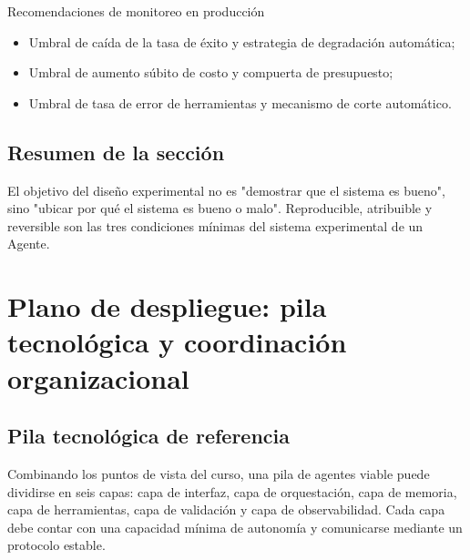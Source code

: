 \documentclass[a4paper]{article}
\begin{document}
\begin{knowledgebox}{Recomendaciones de monitoreo en producción}
\begin{itemize}
    \item Umbral de caída de la tasa de éxito y estrategia de degradación automática;
    \item Umbral de aumento súbito de costo y compuerta de presupuesto;
    \item Umbral de tasa de error de herramientas y mecanismo de corte automático.
\end{itemize}
\end{knowledgebox}

\subsection{Resumen de la sección}
El objetivo del diseño experimental no es "demostrar que el sistema es bueno", sino "ubicar por qué el sistema es bueno o malo". Reproducible, atribuible y reversible son las tres condiciones mínimas del sistema experimental de un Agente.

\section{Plano de despliegue: pila tecnológica y coordinación organizacional}

\subsection{Pila tecnológica de referencia}
Combinando los puntos de vista del curso, una pila de agentes viable puede dividirse en seis capas: capa de interfaz, capa de orquestación, capa de memoria, capa de herramientas, capa de validación y capa de observabilidad. Cada capa debe contar con una capacidad mínima de autonomía y comunicarse mediante un protocolo estable.
\end{document}
